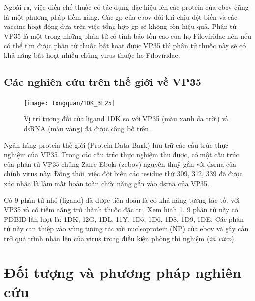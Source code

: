 \documentclass[12pt,a4paper,reqno, oneside]{book}
\begin{document}
	Ngoài ra, việc điều chế thuốc có tác dụng đặc hiệu lên các protein của \gls{ebov} cũng là một phương pháp tiềm năng. Các \gls{gp} của \gls{ebov} đôi khi chịu đột biến và các vaccine hoạt động dựa trên việc tổng hợp \gls{gp} sẽ không còn hiệu quả. Phân tử VP35 là một trong những phân tử có tính bảo tồn cao của họ Filoviridae nên nếu có thể tìm được phân tử thuốc bất hoạt được VP35 thì phân tử thuốc này sẽ có khả năng bất hoạt nhiều chủng virus thuộc họ Filoviridae.
\section{Các nghiên cứu trên thế giới về VP35}
	\begin{figure}[t!]
	\centering
	\texttt{[image: tongquan/1DK\_3L25]}
	\caption{Vị trí tương đối của ligand 1DK so với VP35 (màu xanh da trời) và dsRNA (màu vàng) đã được công bố trên \cite{Brown2014}.}
	\label{fig:1dk_3l25}
	\end{figure}
	Ngân hàng protein thế giới (Protein Data Bank) lưu trữ các cấu trúc thực nghiệm của VP35. Trong các cấu trúc thực nghiệm thu được, có một cấu trúc của phân tử VP35 chủng Zaire Ebola (\gls{zebov}) nguyên thuỷ gắn với \gls{dsrna} của chính virus này\cite{Leung2010}. Đồng thời, việc đột biến các \gls{residue} thứ 309, 312, 339 đã được xác nhận là làm mất hoàn toàn chức năng gắn vào \gls{dsrna} của VP35\cite{Cardenas2006,Hartman2004}.
	
	Có 9 phân tử nhỏ (ligand) đã được tiên đoán là có khả năng tương tác tốt với VP35 và có tiềm năng trở thành thuốc đặc trị\cite{Brown2014,Dapiaggi2015}. Xem hình \ref{fig:1dk_3l25}. 9 phân tử này có PDBID lần lượt là: 1DK, 12G, 1DL, 11Y, 1D5, 1D6, 1D8, 1D9, 1DE. Các phân tử này can thiệp vào vùng tương tác với nucleoprotein (NP) của \gls{ebov} và gây cản trở quá trình nhân lên của virus trong điều kiện phòng thí nghiệm (\emph{in vitro}).
	
	



\newpage
\pagestyle{fancy}
\setcounter{chapter}{1}
\chapter{Đối tượng và phương pháp nghiên cứu}
\end{document}
